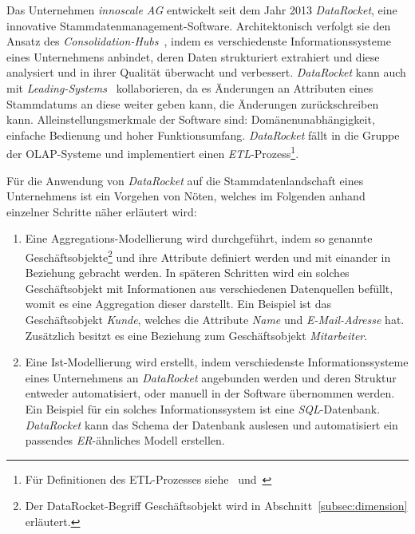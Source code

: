 \documentclass[
  language=german, %
  type=bachelor,%
  ngerman
]{isthesis}
\begin{document}
\begin{content}
	Das Unternehmen \textit{innoscale AG} entwickelt seit dem Jahr 2013
	\textit{DataRocket}, eine innovative Stammdatenmanagement-Software.
	Architektonisch verfolgt sie den Ansatz des
	\textit{Consolidation-Hubs}~\cite[][]{baghi2014toward}, indem es
	verschiedenste Informationssysteme eines Unternehmens anbindet, deren Daten
	strukturiert extrahiert und diese analysiert und in ihrer Qualität überwacht
	und verbessert. \textit{DataRocket} kann auch mit
	\textit{Leading-Systems}~\cite[][]{baghi2014toward} kollaborieren, da es
	Änderungen an Attributen eines Stammdatums an diese weiter geben kann, \bzw{}
	die Änderungen zurückschreiben kann.  Alleinstellungsmerkmale der Software
	sind: Domänenunabhängigkeit, einfache Bedienung und hoher
	Funktionsumfang.
	\textit{DataRocket} fällt in die Gruppe der \acrshort{OLAP}-Systeme und
	implementiert einen \textit{\acrlong{ETL}}-Prozess\footnote{Für Definitionen
	des ETL-Prozesses siehe~\textsc{\citeauthor{vassiliadis2002conceptual}}
	\citeyearpar{vassiliadis2002conceptual}
	und~\textsc{\citeauthor{trujillo2003uml}}}.

  Für die Anwendung von \textit{DataRocket} auf die Stammdatenlandschaft eines
  Unternehmens ist ein Vorgehen von Nöten, welches im Folgenden anhand
  einzelner Schritte näher erläutert wird:

	\begin{enumerate}
		\item Eine Aggregations-Modellierung wird durchgeführt, indem so genannte
		Geschäftsobjekte\footnote{Der DataRocket-Begriff Geschäftsobjekt wird in
		Abschnitt~\ref{subsec:dimension} erläutert.} und ihre Attribute definiert
		werden und mit einander in Beziehung gebracht werden. In späteren Schritten
		wird ein solches Geschäftsobjekt mit Informationen aus verschiedenen
		Datenquellen befüllt, womit es eine Aggregation dieser darstellt. Ein
		Beispiel ist das Geschäftsobjekt \textit{Kunde}, welches die Attribute
		\textit{Name} und \textit{E-Mail-Adresse} hat. Zusätzlich besitzt es eine
		Beziehung zum Geschäftsobjekt \textit{Mitarbeiter}. 

    \item Eine Ist-Modellierung wird erstellt, indem verschiedenste
      Informationssysteme eines Unternehmens an \textit{DataRocket} angebunden
      werden und deren Struktur entweder automatisiert, oder manuell in der
			Software übernommen werden. Ein Beispiel für ein solches
			Informationssystem ist eine \textit{SQL}-Datenbank. \textit{DataRocket}
			kann das Schema der Datenbank auslesen und automatisiert ein passendes
			\textit{\acrshort{ER}}-ähnliches Modell erstellen.


\end{enumerate}
\end{content}
\end{document}
